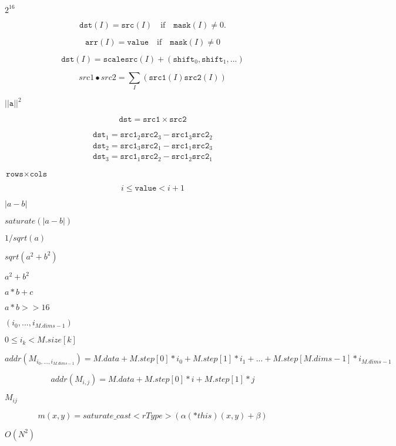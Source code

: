 \documentclass{article}
\begin{document}
$2^{16}$
\pagebreak

\[\texttt{dst} (I)= \texttt{src} (I) \quad \text{if} \quad \texttt{mask} (I) \ne 0.\]
\pagebreak

\[\texttt{arr} (I)= \texttt{value} \quad \text{if} \quad \texttt{mask} (I) \ne 0\]
\pagebreak

\[\texttt{dst} (I) = \texttt{scale} \texttt{src} (I) + ( \texttt{shift} _0, \texttt{shift} _1,...)\]
\pagebreak

\[src1 \bullet src2 = \sum _I ( \texttt{src1} (I) \texttt{src2} (I))\]
\pagebreak

$||\texttt{a}||^2$
\pagebreak

\[\texttt{dst} = \texttt{src1} \times \texttt{src2}\]
\pagebreak

\[\begin{array}{l} \texttt{dst} _1 = \texttt{src1} _2 \texttt{src2} _3 - \texttt{src1} _3 \texttt{src2} _2 \\ \texttt{dst} _2 = \texttt{src1} _3 \texttt{src2} _1 - \texttt{src1} _1 \texttt{src2} _3 \\ \texttt{dst} _3 = \texttt{src1} _1 \texttt{src2} _2 - \texttt{src1} _2 \texttt{src2} _1 \end{array}\]
\pagebreak

$\texttt{rows} \times \texttt{cols}$
\pagebreak

\[i \le \texttt{value} < i+1\]
\pagebreak

$ |a - b| $
\pagebreak

$ saturate(|a - b|) $
\pagebreak

$ 1/sqrt(a) $
\pagebreak

$ sqrt(a^2 + b^2) $
\pagebreak

$ a^2 + b^2 $
\pagebreak

$ a*b + c $
\pagebreak

$ a*b >> 16 $
\pagebreak

$(i_0,...,i_{M.dims-1})$
\pagebreak

$0\leq i_k<M.size[k]$
\pagebreak

\[addr(M_{i_0,...,i_{M.dims-1}}) = M.data + M.step[0]*i_0 + M.step[1]*i_1 + ... + M.step[M.dims-1]*i_{M.dims-1}\]
\pagebreak

\[addr(M_{i,j}) = M.data + M.step[0]*i + M.step[1]*j\]
\pagebreak

$M_{ij}$
\pagebreak

\[m(x,y) = saturate \_ cast<rType>( \alpha (*this)(x,y) + \beta )\]
\pagebreak

$O(N^2)$
\pagebreak
\end{document}
